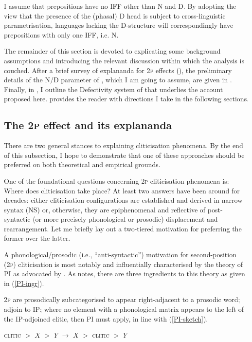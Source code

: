 \documentclass[output=paper]{langsci/langscibook}
\begin{document}
I assume that prepositions have no \gls{IFF} other than N and D. By adopting
the view that the presence of the (phasal) D head is subject to
cross-linguistic parametrisation, languages lacking the D-structure will
correspondingly have prepositions with only one \gls{IFF}, i.e. N.

The remainder of this section is devoted to explicating some background
assumptions and introducing the relevant discussion within which the analysis
is couched. After a brief survey of explananda for \textsc{2p} effects
(), the preliminary details of the N/D parameter of
\citet{Boskovic:2005,Boskovic2008}, which I am going to assume, are given in
. Finally, in , I outline the Defectivity
system of \citet{Roberts2010} that underlies the account proposed here.
 provides the reader with directions I take in the following
sections.

\subsection{The \textsc{2p} effect and its explananda}\label{subsec:2Peff}

There are two general stances to explaining cliticisation
phenomena. By the end of this subsection, I hope to demonstrate that one of
these approaches should be preferred on both theoretical and empirical grounds.

One of the foundational questions concerning \textsc{2p}
cliticisation phenomena is: Where does cliticisation
take place? At least two answers have been around for decades: either
cliticisation configurations are established and derived in narrow
syntax (NS) or, otherwise, they are epiphenomenal and reflective of
post-syntactic (or more precisely phonological or prosodic) displacement and
rearrangement. Let me briefly lay out a two-tiered motivation for preferring
the former over the latter.

A phonological/prosodic (i.e., ``anti-syntactic'') motivation for
second-position (\textsc{2p}) cliticisation is most notably and
influentially characterised by the theory of \gls{PI} as advocated by
\citet{Halpern:1992,halpern:1995dq}. As \citet[422]{roberts:2012uq} notes,
there are three ingredients to this theory as given in (\ref{PI-ingr}).

\begin{exe}
\ex
\begin{xlisti}
\ex \textsc{2p}  are prosodically subcategorised to appear right-ad\-ja\-cent to a prosodic word; \label{PI-i}
\ex {} adjoin to IP; \label{PI-ii}
\ex where no element with a phonological matrix appears to the left of the
IP-adjoined clitic, then \gls{PI} must apply, in line with (\ref{PI-sketch}).
\label{PI-iii}
\end{xlisti}
\label{PI-ingr}
\ex \textsc{clitic} $>$ $X$ $>$ $Y$ $\longrightarrow$  $X$ $>$ \textsc{clitic} $>$ $Y$

\label{PI-sketch}

\end{exe}
\end{document}
